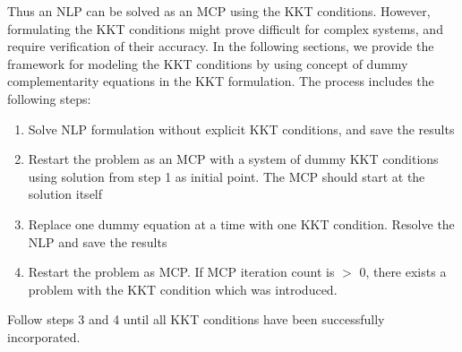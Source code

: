 \documentclass{article}
\begin{document}
\begin{comment}

\begin{equation}
\begin{aligned}
& \bigtriangledown{f(\hat{x})} - \sum_{i=1}^{m} u_{i} \bigtriangledown{g_{i}(\hat{x})}
			- \sum_{k=1}^{p} v_{i} \bigtriangledown{h_{k}(\hat{x})} - \sum_{l=1}^{q} w_{i} \bigtriangledown{d_{l}(\hat{x})} = 0  \\
\\
& h_{k}(\hat{x}) = 0   k = 1,2...p  \\
g_{i}(\hat{x}) \leq 0&	 i = 1,2...m \\  d_{l}(\hat{x}) \geq =0	&	l = 1,2...q
\\
and,\\
<u_{i},g_{i}(x)> = 0 \\ <v_{i},h_{k}(x)> =0 \\  <w_{l},d_{l}(x)> =0
\end{aligned}
\end{equation}

where $<u_{i},g_{i}(x)> = 0$  represent the complimentarily condition and variables u, v, and w represent the marginals of the respective constraint. It is often written as

 $g_{i}(x) \perp L \leq u \leq U $

where symbol $\perp $(referred to as perpendicular  to) indicates pair-wise complementarity between the function g() and variable u and its bounds. The complimentairy condition essentially

\end{comment}

\noindent Thus an NLP can be solved as an MCP using the KKT conditions. However, formulating the KKT conditions might prove difficult for complex systems, and require verification of their accuracy. In the following sections, we provide the framework for modeling the KKT conditions  by using concept of dummy complementarity equations in the KKT formulation. The process includes the following steps:

\begin{enumerate}
	\item Solve NLP formulation without explicit KKT conditions, and save the results
	\item	 Restart the problem as an MCP with a system of dummy KKT conditions using solution from step 1 as initial point. The MCP should start at the solution itself
	\item Replace one dummy equation at a time with one KKT condition. Resolve the NLP and save the results
	\item Restart the problem as MCP. If MCP iteration count is $>$ 0, there exists a problem with the KKT condition which was introduced.
\end{enumerate}
\noindent Follow steps 3 and 4 until all KKT conditions have been successfully incorporated.
\end{document}
